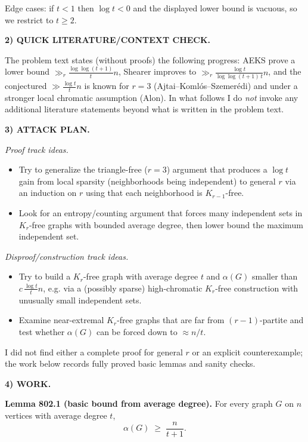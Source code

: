 Edge cases: if $t<1$ then $\log t<0$ and the displayed lower bound is vacuous, so we restrict to $t\ge 2$.

\medskip
\noindent\textbf{2) QUICK LITERATURE/CONTEXT CHECK.}

The problem text states (without proofs) the following progress: AEKS prove a lower bound $\gg_r \frac{\log\log(t+1)}{t}n$, Shearer improves to $\gg_r \frac{\log t}{\log\log(t+1)\,t}n$, and the conjectured $\gg \frac{\log t}{t}n$ is known for $r=3$ (Ajtai--Koml\'os--Szemer\'edi) and under a stronger local chromatic assumption (Alon). In what follows I do \emph{not} invoke any additional literature statements beyond what is written in the problem text.

\medskip
\noindent\textbf{3) ATTACK PLAN.}

\emph{Proof track ideas.}
\begin{itemize}
\item Try to generalize the triangle-free ($r=3$) argument that produces a $\log t$ gain from local sparsity (neighborhoods being independent) to general $r$ via an induction on $r$ using that each neighborhood is $K_{r-1}$-free.
\item Look for an entropy/counting argument that forces many independent sets in $K_r$-free graphs with bounded average degree, then lower bound the maximum independent set.
\end{itemize}

\emph{Disproof/construction track ideas.}
\begin{itemize}
\item Try to build a $K_r$-free graph with average degree $t$ and $\alpha(G)$ smaller than $c\,\frac{\log t}{t}n$, e.g. via a (possibly sparse) high-chromatic $K_r$-free construction with unusually small independent sets.
\item Examine near-extremal $K_r$-free graphs that are far from $(r-1)$-partite and test whether $\alpha(G)$ can be forced down to $\approx n/t$.
\end{itemize}

I did not find either a complete proof for general $r$ or an explicit counterexample; the work below records fully proved basic lemmas and sanity checks.

\medskip
\noindent\textbf{4) WORK.}

\textbf{Lemma 802.1 (basic bound from average degree).}
For every graph $G$ on $n$ vertices with average degree $t$,
\[
\alpha(G)\;\ge\;\frac{n}{t+1}.
\]

